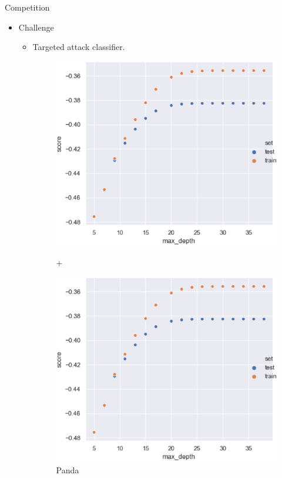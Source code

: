 \documentclass[
 size=12pt,
 paper=smartboard, %
 mode=present, %
 display=slides, %
style=tuliplab,
pauseslide,
fleqn,leqno]{powerdot}
\begin{document}
\begin{slide}{Competition}
  \begin{itemize}
    \item Challenge \pause
    \begin{itemize}
      \item Targeted attack classifier.
      \begin{figure}[h]
        \begin{minipage}[t]{0.3\linewidth}
          \centering
          \includegraphics[width=1.0\textwidth]{figures2/max_depth_score.eps}
          \caption{Panda}
          \label{fig:source-pic}
        \end{minipage} \pause
        +
        \begin{minipage}[t]{0.3\linewidth}
          \centering
          \includegraphics[width=1.0\textwidth]{figures2/max_depth_score.eps}

\end{minipage}
\end{figure}
\end{itemize}
\end{itemize}
\end{slide}
\end{document}
